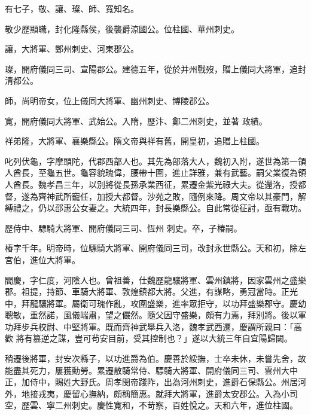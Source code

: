 \begin{pinyinscope}
 有七子，敬、讓、璨、師、寬知名。



 敬少歷顯職，封化隆縣侯，後襲爵涼國公。位柱國、華州刺史。



 讓，大將軍、鄭州刺史、河東郡公。



 璨，開府儀同三司、宣陽郡公。建德五年，從於并州戰歿，贈上儀同大將軍，追封清都公。



 師，尚明帝女，位上儀同大將軍、幽州刺史、博陵郡公。



 寬，開府儀同大將軍、武始公。入隋，歷汴、鄭二州刺史，並著
 政績。



 祥弟隆，大將軍、襄樂縣公。隋文帝與祥有舊，開皇初，追贈上柱國。



 叱列伏龜，字摩頭陀，代郡西部人也。其先為部落大人，魏初入附，遂世為第一領人酋長，至龜五世。龜容貌瑰偉，腰帶十圍，進止詳雅，兼有武藝。嗣父業復為領人酋長。魏孝昌三年，以別將從長孫承業西征，累遷金紫光祿大夫。從還洛，授都督，遂為齊神武所寵任，加授大都督。沙苑之敗，隨例來降。周文帝以其豪門，解縛禮之，仍以邵惠公女妻之。大統四年，封長樂縣公。自此常從征討，亟有戰功。



 歷侍中、驃騎大將軍、開府儀同三司、恆州
 刺史。卒，子椿嗣。



 椿字千年。明帝時，位驃騎大將軍、開府儀同三司，改封永世縣公。天和初，除左宮伯，進位大將軍。



 閻慶，字仁度，河陰人也。曾祖善，仕魏歷龍驤將軍、雲州鎮將，因家雲州之盛樂郡。祖提，持節、車騎大將軍、敦煌鎮都大將。父進，有謀略，勇冠當時。正光中，拜龍驤將軍。屬衛可瑰作亂，攻圍盛樂，進率眾拒守，以功拜盛樂郡守。慶幼聰敏，重然諾，風儀端肅，望之儼然。隨父因守盛樂，頗有力焉，拜別將。後以軍功拜步兵校尉、中堅將軍。既而齊神武舉兵入洛，魏孝武西遷，慶謂所親曰：「高歡
 將有篡逆之謀，豈可茍安目前，受其控制也？」遂以大統三年自宜陽歸闕。



 稍遷後將軍，封安次縣子，以功進爵為伯。慶善於綏撫，士卒未休，未嘗先舍，故能盡其死力，屢獲勳勞。累遷散騎常侍、驃騎大將軍、開府儀同三司、雲州大中正，加侍中，賜姓大野氏。周孝閔帝踐阼，出為河州刺史，進爵石保縣公。州居河外，地接戎夷，慶留心撫納，頗稱簡惠。就拜大將軍，進爵太安郡公。入為小司空，歷雲、寧二州刺史。慶性寬和，不苛察，百姓悅之。天和六年，進位柱國。




\end{pinyinscope}
